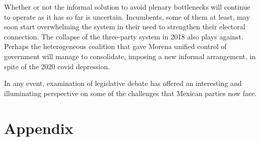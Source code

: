 \documentclass[letter,12pt]{article}
\begin{document}
Whether or not the informal solution to avoid plenary bottlenecks will continue to operate as it has so far is uncertain. Incumbents, some of them at least, may soon start overwhelming the system in their need to strengthen their electoral connection. The collapse of the three-party system in 2018 also plays against. Perhaps the heterogeneous coalition that gave Morena unified control of government will manage to consolidate, imposing a new informal arrangement, in spite of the 2020 covid depression.

In any event, examination of legislative debate has offered an interesting and illuminating perspective on some of the challenges that Mexican parties now face.   







\singlespacing

\section{Appendix}
\end{document}
